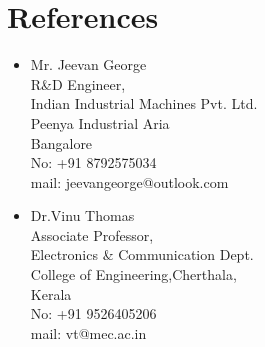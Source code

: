\documentclass[11pt,a4paper,sans]{moderncv} %
\begin{document}
\section{\textbf{References}}
\begin{cvcolumns}
\cvcolumn{}
{\begin{itemize}
\item Mr. Jeevan George\\R\&D Engineer,\\Indian Industrial Machines Pvt. Ltd.\\Peenya Industrial Aria\\Bangalore\\No: +91 8792575034\\mail: jeevangeorge@outlook.com
\end{itemize}
}
			
\cvcolumn{}
{
\begin{itemize}
\item Dr.Vinu Thomas\\Associate Professor,\\Electronics \& Communication Dept.\\College of Engineering,Cherthala,\\Kerala\\No: +91 9526405206\\mail: vt@mec.ac.in  
\end{itemize}
}
					
\end{cvcolumns}


\begin{comment}

\clearpage

\recipient{HR Department}{Corporation\\123 Pleasant Lane\\12345 City, State} %
\date{\today} %
\opening{Dear Sir or Madam,} %
\closing{Sincerely yours,} %
\enclosure[Attached]{curriculum vit\ae{}} %

\makelettertitle %

\lipsum[1-3] %

\makeletterclosing %
\end{comment}
\end{document}
